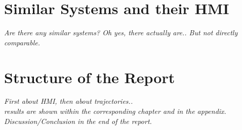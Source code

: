\section{Similar Systems and their HMI}
\label{sec:similar systems}
\textit{Are there any similar systems? Oh yes, there actually are.. But not directly comparable.}

\section{Structure of the Report}
\label{structure}
\textit{First about HMI, then about trajectories.. \\ results are shown within the corresponding chapter and in the appendix. Discussion/Conclusion in the end of the report.}